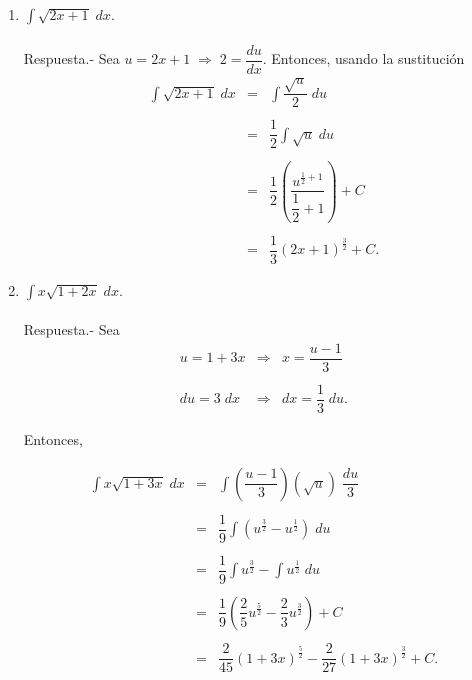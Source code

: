 \begin{enumerate}[\bfseries 1.]

    \item $\displaystyle\int \sqrt{2x+1}\; dx$.\\\\
	Respuesta.-\; Sea $u=2x+1 \; \Rightarrow \; 2=\dfrac{du}{dx}.$
	Entonces, usando la sustitución
	$$\begin{array}{rcl}
	    \displaystyle \int \sqrt{2x+1}\; dx &=& \displaystyle \int \dfrac{\sqrt{u}}{2}\; du\\\\
	    &=& \displaystyle \dfrac{1}{2}\int \sqrt{u}\; du\\\\
	    &=& \dfrac{1}{2} \left(\dfrac{u^{\frac{1}{2}+1}}{\dfrac{1}{2}+1}\right)+C\\\\
	    &=& \dfrac{1}{3}(2x+1)^{\frac{3}{2}}+C.
	\end{array}$$
	\vspace{.5cm}

    \item $\displaystyle \int x\sqrt{1+2x}\; dx$.\\\\
	Respuesta.-\; Sea 
	$$\begin{array}{rcl}
	    u = 1+3x & \Rightarrow & x=\dfrac{u-1}{3}\\\\
	    du=3\; dx & \Rightarrow & dx=\dfrac{1}{3}\; du.
	\end{array}$$

	Entonces,

	$$\begin{array}{rcl}
	    \displaystyle \int x\sqrt{1+3x}\; dx &=& \displaystyle\int \left(\dfrac{u-1}{3}\right)\left(\sqrt{u}\right)\; \dfrac{du}{3}\\\\
						 &=&\dfrac{1}{9}\displaystyle \int \left(u^{\frac{3}{2}}-u^{\frac{1}{2}}\right)\; du\\\\
						 &=& \dfrac{1}{9}\displaystyle \int u^{\frac{3}{2}} - \int u^{\frac{1}{2}}\; du\\\\
						 &=& \dfrac{1}{9}\left(\dfrac{2}{5}u^{\frac{5}{2}}-\dfrac{2}{3}u^{\frac{3}{2}}\right) + C\\\\
						 &=& \dfrac{2}{45}(1+3x)^{\frac{5}{2}} - \dfrac{2}{27}(1+3x)^{\frac{3}{2}} + C.
	\end{array}$$
	\vspace{.5cm}


\end{enumerate}
